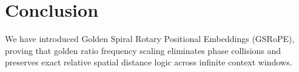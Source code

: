 \section{Conclusion}
We have introduced Golden Spiral Rotary Positional Embeddings (GSRoPE), proving that golden ratio frequency scaling eliminates phase collisions and preserves exact relative spatial distance logic across infinite context windows.